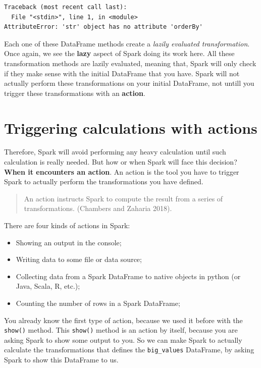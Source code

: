 \documentclass[
  11pt,
  letterpaper,
  DIV=11,
  numbers=noendperiod]{scrreprt}
\providecommand{\tightlist}{%
  \setlength{\itemsep}{0pt}\setlength{\parskip}{0pt}}\usepackage{longtable,booktabs,array}
\begin{document}
\begin{verbatim}
Traceback (most recent call last):
  File "<stdin>", line 1, in <module>
AttributeError: 'str' object has no attribute 'orderBy'
\end{verbatim}

Each one of these DataFrame methods create a \emph{lazily evaluated
transformation}. Once again, we see the \textbf{lazy} aspect of Spark
doing its work here. All these transformation methods are lazily
evaluated, meaning that, Spark will only check if they make sense with
the initial DataFrame that you have. Spark will not actually perform
these transformations on your initial DataFrame, not untill you trigger
these transformations with an \textbf{action}.

\section{Triggering calculations with
actions}\label{sec-dataframe-actions}

Therefore, Spark will avoid performing any heavy calculation until such
calculation is really needed. But how or when Spark will face this
decision? \textbf{When it encounters an action}. An action is the tool
you have to trigger Spark to actually perform the transformations you
have defined.

\begin{quote}
An action instructs Spark to compute the result from a series of
transformations. (Chambers and Zaharia 2018).
\end{quote}

There are four kinds of actions in Spark:

\begin{itemize}
\tightlist
\item
  Showing an output in the console;
\item
  Writing data to some file or data source;
\item
  Collecting data from a Spark DataFrame to native objects in python (or
  Java, Scala, R, etc.);
\item
  Counting the number of rows in a Spark DataFrame;
\end{itemize}

You already know the first type of action, because we used it before
with the \texttt{show()} method. This \texttt{show()} method is an
action by itself, because you are asking Spark to show some output to
you. So we can make Spark to actually calculate the transformations that
defines the \texttt{big\_values} DataFrame, by asking Spark to show this
DataFrame to us.
\end{document}
